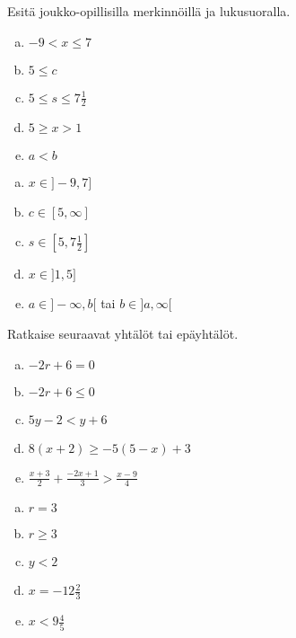 \begin{tehtava}
    Esitä joukko-opillisilla merkinnöillä ja lukusuoralla.
    \begin{enumerate}[a)]
        \item $-9<x \leq 7$
        \item $5\leq c$
        \item $5\leq s \leq 7\frac{1}{2}$
        \item $5\geq x>1$
        \item $a<b$
    \end{enumerate}
    \begin{vastaus}
        \begin{enumerate}[a)]
            \item $x \in ]-9,7]$
            \item $c \in [5,\infty]$
            \item $s \in [5,7\frac{1}{2}]$
            \item $x \in ]1,5]$
            \item $a \in ]-\infty,b[$ \quad tai \quad $b \in ]a, \infty[$
        \end{enumerate}
    \end{vastaus}
\end{tehtava}

\begin{tehtava}
    Ratkaise seuraavat yhtälöt tai epäyhtälöt.
    \begin{enumerate}[a)]
        \item $-2r+6=0$
        \item $-2r+6\leq 0$
        \item $5y-2<y+6$
        \item $8(x+2)\geq -5(5-x)+3$
        \item $\frac{x+3}{2}+\frac{-2x+1}{3}>\frac{x-9}{4}$
    \end{enumerate}
    \begin{vastaus}
        \begin{enumerate}[a)]
            \item $r=3$
            \item $r\geq 3$
            \item $y<2$
            \item $x=-12\frac{2}{3}$
            \item $x<9\frac{4}{5}$
        \end{enumerate}
    \end{vastaus}
\end{tehtava}

